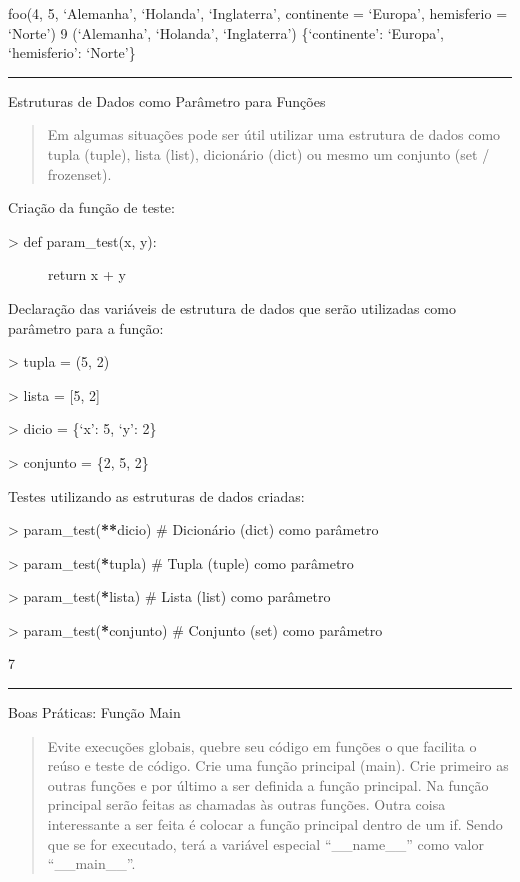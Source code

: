 \documentclass[letterpaper,10pt,brazil]{sphinxmanual}
\begin{document}
foo(4, 5, ‘Alemanha’, ‘Holanda’, ‘Inglaterra’, continente = ‘Europa’, hemisferio = ‘Norte’)
9
(‘Alemanha’, ‘Holanda’, ‘Inglaterra’)
\{‘continente’: ‘Europa’, ‘hemisferio’: ‘Norte’\}


\bigskip\hrule\bigskip


Estruturas de Dados como Parâmetro para Funções
\begin{quote}

Em algumas situações pode ser útil utilizar uma estrutura de dados como tupla (tuple), lista (list), dicionário (dict) ou mesmo um conjunto (set / frozenset).
\end{quote}

Criação da função de teste:
\begin{description}
\item[{\textgreater{} def param\_test(x, y):}] \leavevmode
return x + y

\end{description}

Declaração das variáveis de estrutura de dados que serão utilizadas como parâmetro para a função:

\textgreater{} tupla = (5, 2)

\textgreater{} lista = {[}5, 2{]}

\textgreater{} dicio = \{‘x’: 5, ‘y’: 2\}

\textgreater{} conjunto = \{2, 5, 2\}

Testes utilizando as estruturas de dados criadas:

\textgreater{} param\_test({\color{red}\bfseries{}**}dicio)  \# Dicionário (dict) como parâmetro

\textgreater{} param\_test({\color{red}\bfseries{}*}tupla)  \# Tupla (tuple) como parâmetro

\textgreater{} param\_test({\color{red}\bfseries{}*}lista)  \# Lista (list) como parâmetro

\textgreater{} param\_test({\color{red}\bfseries{}*}conjunto)  \# Conjunto (set) como parâmetro

7


\bigskip\hrule\bigskip


Boas Práticas: Função Main
\begin{quote}

Evite execuções globais, quebre seu código em funções o que facilita o reúso e teste de código.
Crie uma função principal (main). Crie primeiro as outras funções e por último a ser definida a função principal.
Na função principal serão feitas as chamadas às outras funções.
Outra coisa interessante a ser feita é colocar a função principal dentro de um if. Sendo que se for executado, terá a variável especial “\_\_name\_\_” como valor “\_\_main\_\_”.
\end{quote}
\end{document}
